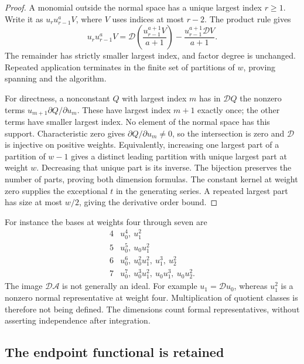 \begin{proof}
A monomial outside the normal space has a unique largest index
$r\ge1$.  Write it as $u_r u_{r-1}^a V$, where $V$ uses indices
at most $r-2$.  The product rule gives
\begin{equation}\label{ibp:step}
 u_r u_{r-1}^a V
 =\mathcal D\left(\frac{u_{r-1}^{a+1}V}{a+1}\right)
       -\frac{u_{r-1}^{a+1}\mathcal D V}{a+1}.
\end{equation}
The remainder has strictly smaller largest index, and factor degree
is unchanged.  Repeated application terminates in the finite set of
partitions of $w$, proving spanning and the algorithm.

For directness, a nonconstant $Q$ with largest index $m$ has in
$\mathcal DQ$ the nonzero terms
$u_{m+1}\partial Q/\partial u_m$.  These have largest index $m+1$
exactly once; the other terms have smaller largest index.  No element
of the normal space has this support.  Characteristic zero gives
$\partial Q/\partial u_m\ne0$, so the intersection is zero and
$\mathcal D$ is injective on positive weights.  Equivalently, increasing
one largest part of a partition of $w-1$ gives a distinct leading
partition with unique largest part at weight $w$.  Decreasing that
unique part is its inverse.  The bijection preserves the number of
parts, proving both dimension formulas.  The constant kernel at
weight zero supplies the exceptional $t$ in the generating series.
A repeated largest part has size at most $w/2$, giving the derivative
order bound.
\end{proof}

For instance the bases at weights four through seven are
\[
\begin{array}{c|l}
4&u_0^4,\ u_1^2\\
5&u_0^5,\ u_0u_1^2\\
6&u_0^6,\ u_0^2u_1^2,\ u_1^3,\ u_2^2\\
7&u_0^7,\ u_0^3u_1^2,\ u_0u_1^3,\ u_0u_2^2.
\end{array}
\]
The image $\mathcal D\mathcal A$ is not generally an ideal.
For example $u_1=\mathcal D u_0$, whereas $u_1^2$ is a nonzero
normal representative at weight four.  Multiplication of quotient
classes is therefore not being defined.  The dimensions count formal
representatives, without asserting independence after integration.

\subsection{The endpoint functional is retained}

